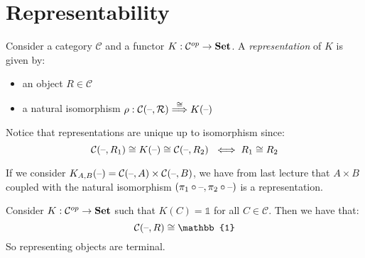 \chapter{Representability}

\begin{definition}[Representation]
Consider a category $\mathcal{C}$ and a functor 
$K: \mathcal{C}^{op} \rightarrow \mathbf {Set} $.
A \emph{representation} of $K$ is given by:
\begin{itemize}
  \item an object $R \in \mathcal{C}$
  \item a natural isomorphism $\rho: \mathcal{C(\text{--}, R)}
    \overset{\cong}{\Longrightarrow} K(\text{--}) $
  \end{itemize}
\end{definition}
Notice that representations are unique up to isomorphism since:
\[\mathcal{C}(\text{--}, R_1) \cong K(\text{--}) \cong 
\mathcal{C}(\text{--}, R_2)\ \iff R_1 \cong R_2\]

\begin{example}
If we consider $K_{A,B}(\text{--}) = \mathcal{C}(\text{--}, A) \times \mathcal{C}
(\text{--}, B)$, we have from last lecture that $A \times B$ coupled with the
natural isomorphism $(\pi_1 \circ \text{--}, \pi_2 \circ \text{--})$ is a
representation.  
\end{example}

\begin{example}
Consider  $K: \mathcal{C}^{op} \rightarrow \mathbf {Set} $ such that 
$K(C) = \mathbb{1}$ for all $C\in\mathcal C$. Then we have that:
\[\mathcal{C}(\phold, R) \cong \mathbb{1}\]
So representing objects are terminal.

\end{example}
